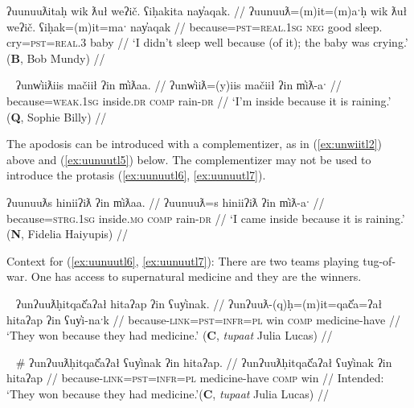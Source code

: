 
\ex \label{ex:uunuutl1}
\begingl
\glpreamble ʔuunuuƛitaḥ wik ƛuł weʔič. ʕiḥakita nay̓aqak. //
\gla ʔuunuuƛ=(m)it=(m)aˑḥ wik ƛuł weʔič. ʕiḥak=(m)it=maˑ nay̓aqak //
\glb because=\textsc{pst}=\textsc{real.1sg} \textsc{neg} good sleep. cry=\textsc{pst}=\textsc{real.3} baby //
\glft `I didn't sleep well because (of it); the baby was crying.' (\textbf{B}, Bob Mundy) //
\endgl
\xe

\ex~ \label{ex:unwiitl2}
\begingl
\glpreamble ʔunw̓iiƛiis mačiił ʔin m̓iƛaa. //
\gla ʔunw̓iiƛ=(y)iis mačiił ʔin m̓iƛ-aˑ //
\glb because=\textsc{weak.1sg} inside.\textsc{dr} \textsc{comp} rain-\textsc{dr} //
\glft `I'm inside because it is raining.' (\textbf{Q}, Sophie Billy) //
\endgl
\xe

The apodosis can be introduced with a complementizer, as in (\ref{ex:unwiitl2}) above and (\ref{ex:uunuutl5}) below. The complementizer may not be used to introduce the protasis (\ref{ex:uunuutl6}, \ref{ex:uunuutl7}).

\ex \label{ex:uunuutl5}
\begingl
\glpreamble ʔuunuuƛs hiniiʔiƛ ʔin m̓iƛaa. //
\gla ʔuunuuƛ=s hiniiʔiƛ ʔin m̓iƛ-aˑ //
\glb because=\textsc{strg.1sg} inside.\textsc{mo} \textsc{comp} rain-\textsc{dr} //
\glft `I came inside because it is raining.' (\textbf{N}, Fidelia Haiyupis) //
\endgl
\xe

\vspace{5pt}

Context for (\ref{ex:uunuutl6}, \ref{ex:uunuutl7}): There are two teams playing tug-of-war. One has access to supernatural medicine and they are the winners.

\ex~ \label{ex:uunuutl6}
\begingl
\glpreamble ʔunʔuuƛḥitqač̓aʔał hitaʔap ʔin ʕuy̓inak. //
\gla ʔunʔuuƛ-(q)ḥ=(m)it=qač̓a=ʔał hitaʔap ʔin ʕuy̓i-naˑk //
\glb because-\textsc{link}=\textsc{pst}=\textsc{infr}=\textsc{pl} win \textsc{comp} medicine-have //
\glft `They won because they had medicine.' (\textbf{C}, \textit{tupaat} Julia Lucas) //
\endgl
\xe

\ex~ \label{ex:uunuutl7}
\begingl
\glpreamble \# ʔunʔuuƛḥitqač̓aʔał ʕuy̓inak ʔin hitaʔap. //
\gla ʔunʔuuƛḥitqač̓aʔał ʕuy̓inak ʔin hitaʔap //
\glb because-\textsc{link}=\textsc{pst}=\textsc{infr}=\textsc{pl} medicine-have \textsc{comp} win //
\glft Intended: `They won because they had medicine.'\footnotemark (\textbf{C}, \textit{tupaat} Julia Lucas) //
\endgl
\xe

